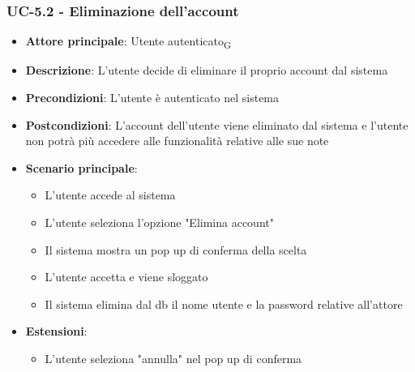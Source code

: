 \documentclass[11pt,a4paper]{article}
\newcommand{\gls}[1]{#1\textsubscript{G}}
\begin{document}
\subsubsection{UC-5.2 - Eliminazione dell'account}
\begin{itemize}
    \item \textbf{Attore principale}: \gls{Utente autenticato}
    \item \textbf{Descrizione}: L'utente decide di eliminare il proprio account dal sistema
    \item \textbf{Precondizioni}: L'utente è autenticato nel sistema
    \item \textbf{Postcondizioni}: L'account dell'utente viene eliminato dal sistema e l'utente non potrà più accedere alle funzionalità relative alle sue note
    \item \textbf{Scenario principale}:
        \begin{itemize}
            \item L'utente accede al sistema
            \item L'utente seleziona l'opzione "Elimina account"
            \item Il sistema mostra un pop up di conferma della scelta
            \item L'utente accetta e viene sloggato
            \item Il sistema elimina dal db il nome utente e la password relative all'attore
        \end{itemize}
    \item \textbf{Estensioni}:
        \begin{itemize}
            \item L'utente seleziona "annulla" nel pop up di conferma
        \end{itemize}
\end{itemize}
\end{document}
